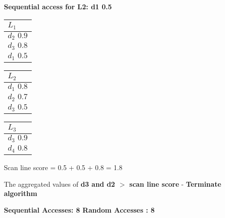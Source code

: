 \textbf{Sequential access for L2: d1 0.5}
 \begin{center}
    \begin{minipage}[t]{2cm}
        \begin{tabular}{|p{25pt}|}\hline
          $L_1$\\\hline
          $d_2 \, \, 0.9$\\\hline
          $d_3 \, \, 0.8$\\\hline
          $d_1 \, \, 0.5$\\\hline
        \end{tabular}
    \end{minipage}
    \hspace{5mm}
    \begin{minipage}[t]{2cm}
        \begin{tabular}{|p{25pt}|}\hline
          $L_2$\\\hline
          $d_1 \, \, 0.8$\\\hline
          $d_2 \, \, 0.7$\\\hline
          $d_3 \, \, 0.5$\\\hline
            \end{tabular}
    \end{minipage}
    \hspace{5mm}
    \begin{minipage}[t]{2cm}
        \begin{tabular}{|p{25pt}|}\hline
        $L_3$\\\hline
        $d_3 \, \, 0.9$\\\hline 
        $d_4 \, \, 0.8$\\\hline
        \end{tabular}
    \end{minipage}
    \end{center}
    
Scan line score = 0.5 + 0.5 + 0.8 = 1.8

The aggregated values of\textbf{ d3 and d2 $>$ scan line score} - \textbf{Terminate algorithm }  

\textbf{Sequential Accesses: 8
Random Accesses : 8}


